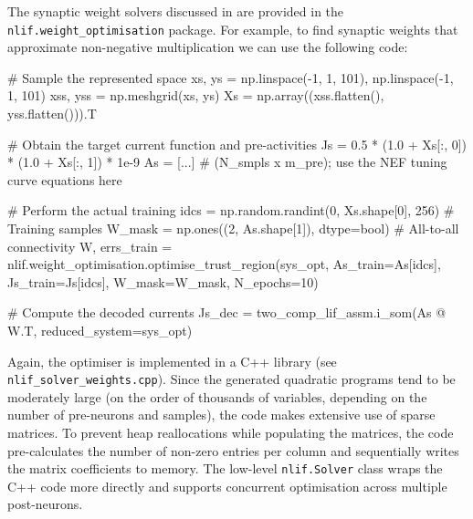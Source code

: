 The synaptic weight solvers discussed in  are provided in the \texttt{nlif.weight\_optimisation} package.
For example, to find synaptic weights that approximate non-negative multiplication we can use the following code:
\begin{pythoncode}
# Sample the represented space
xs, ys = np.linspace(-1, 1, 101), np.linspace(-1, 1, 101)
xss, yss = np.meshgrid(xs, ys)
Xs = np.array((xss.flatten(), yss.flatten())).T

# Obtain the target current function and pre-activities
Js = 0.5 * (1.0 + Xs[:, 0]) * (1.0 + Xs[:, 1]) * 1e-9
As = [...] # (N_smpls x m_pre); use the NEF tuning curve equations here

# Perform the actual training
idcs = np.random.randint(0, Xs.shape[0], 256)  # Training samples
W_mask = np.ones((2, As.shape[1]), dtype=bool) # All-to-all connectivity
W, errs_train = nlif.weight_optimisation.optimise_trust_region(sys_opt,
    As_train=As[idcs], Js_train=Js[idcs], W_mask=W_mask, N_epochs=10)

# Compute the decoded currents
Js_dec = two_comp_lif_assm.i_som(As @ W.T, reduced_system=sys_opt)
\end{pythoncode}
Again, the optimiser is implemented in a C++ library (see \texttt{nlif\_solver\_weights.cpp}).
Since the generated quadratic programs tend to be moderately large (on the order of thousands of variables, depending on the number of pre-neurons and samples), the code makes extensive use of sparse matrices.
To prevent heap reallocations while populating the matrices, the code pre-calculates the number of non-zero entries per column and sequentially writes the matrix coefficients to memory.
The low-level \texttt{nlif.Solver} class wraps the C++ code more directly and supports concurrent optimisation across multiple post-neurons.
